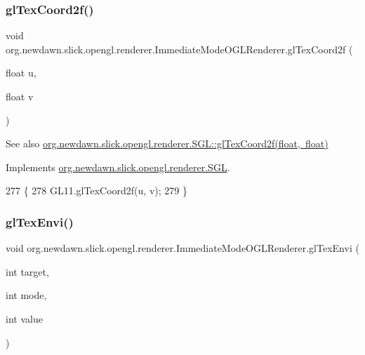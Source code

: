 \subsubsection{\texorpdfstring{gl\+Tex\+Coord2f()}{glTexCoord2f()}}
{\footnotesize\ttfamily void org.\+newdawn.\+slick.\+opengl.\+renderer.\+Immediate\+Mode\+O\+G\+L\+Renderer.\+gl\+Tex\+Coord2f (\begin{DoxyParamCaption}\item[{float}]{u,  }\item[{float}]{v }\end{DoxyParamCaption})\hspace{0.3cm}{\ttfamily [inline]}}

\begin{DoxySeeAlso}{See also}
\mbox{\hyperlink{interfaceorg_1_1newdawn_1_1slick_1_1opengl_1_1renderer_1_1_s_g_l_a5f661318cf9926c586a9837d0ded9fbd}{org.\+newdawn.\+slick.\+opengl.\+renderer.\+S\+G\+L\+::gl\+Tex\+Coord2f(float, float)}} 
\end{DoxySeeAlso}


Implements \mbox{\hyperlink{interfaceorg_1_1newdawn_1_1slick_1_1opengl_1_1renderer_1_1_s_g_l_a5f661318cf9926c586a9837d0ded9fbd}{org.\+newdawn.\+slick.\+opengl.\+renderer.\+S\+GL}}.


\begin{DoxyCode}
277                                                \{
278         GL11.glTexCoord2f(u, v);
279     \}
\end{DoxyCode}
\mbox{\label{classorg_1_1newdawn_1_1slick_1_1opengl_1_1renderer_1_1_immediate_mode_o_g_l_renderer_ac494c89daacc662a13738f125120b202}} 
\subsubsection{\texorpdfstring{gl\+Tex\+Envi()}{glTexEnvi()}}
{\footnotesize\ttfamily void org.\+newdawn.\+slick.\+opengl.\+renderer.\+Immediate\+Mode\+O\+G\+L\+Renderer.\+gl\+Tex\+Envi (\begin{DoxyParamCaption}\item[{int}]{target,  }\item[{int}]{mode,  }\item[{int}]{value }\end{DoxyParamCaption})\hspace{0.3cm}{\ttfamily [inline]}}

